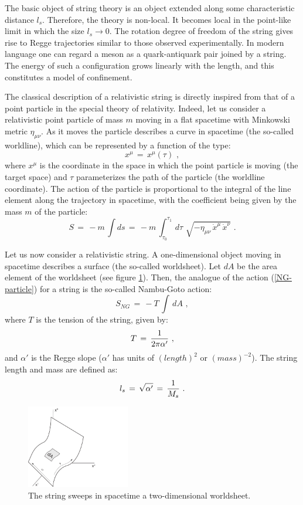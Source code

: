 \documentclass[12pt,notitlepage,a4paper]{article}
\newcommand{\beq}{\begin{equation}}
\newcommand{\eeq}{\end{equation}}
\begin{document}
The basic object of string theory is an object extended along some characteristic distance $l_s$. Therefore, the  theory is non-local. It becomes local in the point-like  limit in which the size $l_s\to 0$.  The rotation degree of freedom of the string gives rise to Regge trajectories similar to those observed experimentally. In modern language one can regard a meson as a quark-antiquark  pair joined by a string. The energy of such a configuration grows linearly with the length, and this constitutes a model of confinement. 


The classical description of a relativistic string is directly inspired from that of a point particle in the special theory of relativity. Indeed, let us consider a relativistic point particle  of mass $m$ moving in a flat spacetime with Minkowski metric $\eta_{\mu\nu}$. As it moves the particle describes a curve in spacetime (the so-called worldline), which can be represented by a function of the type:
\beq
x^{\mu}\,=\,x^{\mu}(\tau)\,\,,
\eeq
where $x^{\mu}$ is the coordinate in the space in which the point particle is moving (the target space) and  $\tau$  parameterizes the path of the particle (the worldline coordinate). The action  of the particle is proportional to the integral of the  line element along the trajectory in spacetime, with the coefficient being given by the mass $m$ of the particle:
\beq
S\,=\,-m\,\int ds\,=\,
-m\,\int_{\tau_0}^{\tau_1}\,d\tau \,\,\sqrt{-\eta_{\mu\nu}\,\dot x^{\mu}\,\dot x^{\nu}}\,\,.
\label{NG-particle}
\eeq






Let us now consider a relativistic string. A one-dimensional object moving in spacetime describes a surface (the so-called worldsheet). Let $dA$ be the area element of the worldsheet (see figure \ref{worldsheet}). Then, the analogue of the action (\ref{NG-particle}) for  a string is the so-called Nambu-Goto action:
\beq
S_{NG}\,=\,-T\,\int \,dA\,\,,
\label{NG-string}
\eeq
where $T$ is the tension of the string, given by:
\beq
T\,=\,{1\over 2\pi\alpha'}\,\,,
\eeq
and $\alpha'$ is the Regge slope ($\alpha'$ has units of $(length)^2 $ or $(mass)^{-2}$). The string length and mass are defined as:
\beq
l_s\,=\,\sqrt{\alpha'}\,=\,{1\over M_s}\,\,.
\label{ls}
\eeq

\begin{figure}[ht]
\center
\qquad\qquad\includegraphics[width=0.4\textwidth]{Wsheet.pdf}
\caption{The string sweeps in spacetime a two-dimensional worldsheet. } 
\label{worldsheet}
\end{figure}
\end{document}
